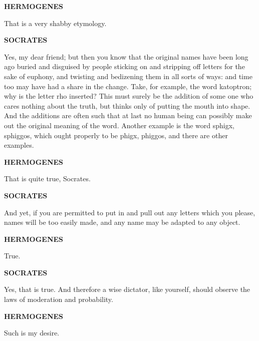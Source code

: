 \documentclass[11pt,letter]{article}
\begin{document}
\par \textbf{HERMOGENES}
\par   That is a very shabby etymology.

\par \textbf{SOCRATES}
\par   Yes, my dear friend; but then you know that the original names have been long ago buried and disguised by people sticking on and stripping off letters for the sake of euphony, and twisting and bedizening them in all sorts of ways:  and time too may have had a share in the change. Take, for example, the word katoptron; why is the letter rho inserted? This must surely be the addition of some one who cares nothing about the truth, but thinks only of putting the mouth into shape. And the additions are often such that at last no human being can possibly make out the original meaning of the word. Another example is the word sphigx, sphiggos, which ought properly to be phigx, phiggos, and there are other examples.

\par \textbf{HERMOGENES}
\par   That is quite true, Socrates.

\par \textbf{SOCRATES}
\par   And yet, if you are permitted to put in and pull out any letters which you please, names will be too easily made, and any name may be adapted to any object.

\par \textbf{HERMOGENES}
\par   True.

\par \textbf{SOCRATES}
\par   Yes, that is true. And therefore a wise dictator, like yourself, should observe the laws of moderation and probability.

\par \textbf{HERMOGENES}
\par   Such is my desire.
\end{document}
